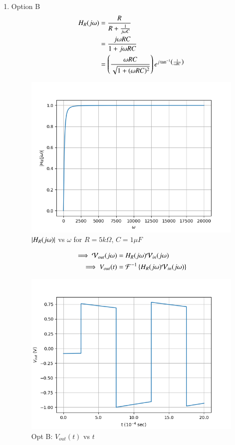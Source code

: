 \documentclass[journal,12pt,twocolumn]{IEEEtran}
\theoremstyle{remark}
\begin{document}
\begin{enumerate}
    \item Option B
    \begin{align}
        H_R(j\omega) &=  \frac{R}{R + \frac{1}{j\omega C}}\\
        &= \frac{j\omega RC}{1+j\omega RC}\\
        &= \left(\frac{\omega R C}{\sqrt{1 + (\omega R C)^2}}\right)e^{j\tan^{-1}\left(\frac{1}{\omega RC}\right)}
    \end{align}
    \begin{figure}[!h]
        \centering
        \includegraphics[width=\columnwidth]{figs/opt_b_hf.png}
        \caption{$\left\vert H_R(j\omega)\right\vert$ vs $\omega$ for $R=5k\Omega$, $C=1\mu F$}
        \label{fig:opt_b_hf_gate.ph.23.37}
    \end{figure}
    \begin{align}
        \implies \mathcal{V}_{out}(j\omega) &= H_R(j\omega)\mathcal{V}_{in}(j\omega)\\
        \implies V_{out}(t) &= \mathcal{F}^{-1}\left\{H_R(j\omega)\mathcal{V}_{in}(j\omega)\right\}
    \end{align}
    \begin{figure}[!h]
        \centering
        \includegraphics[width = \columnwidth]{figs/opt_b_res.png}
        \caption{Opt B: $V_{out}(t)$ vs $t$}
        \label{fig:opt_b_res_gate.23.ph.37}
    \end{figure}


\end{enumerate}
\end{document}
